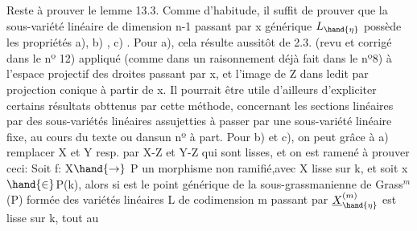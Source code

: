 
Reste à prouver le lemme 13.3.  Comme d'habitude, il suffit de prouver
que  la sous-variété linéaire de dimension n-1  passant par x générique
$L_{\hand{\eta}}$  possède les propriétés  a), b) , c) .  Pour  a),  cela résulte 
aussitôt de 2.3. (revu et corrigé dans le nº 12)  appliqué (comme dans un
raisonnement déjà fait dans le nº8) à l'espace projectif  des droites
passant par x, et l'image de Z dans ledit par projection conique à
partir de x. \hand{[}Il pourrait être utile d'ailleurs d'expliciter certains
 résultats obttenus par cette méthode, concernant les sections linéaires
par des sous-variétés linéaires assujetties à passer par une sous-variété
linéaire fixe,  au cours du texte ou dans\hand{/}un nº à part\hand{]}.  Pour  b) et c),
 on peut grâce à a)  remplacer X et Y  resp. par X-Z et Y-Z
qui sont lisses, et on est  ramené à prouver ceci:  Soit f: X$\hand{\rightarrow}$ P un
morphisme non ramifié,\hand{(}avec X lisse sur k, et soit  x $\hand{\in}$P(k), alors si
\hand{$\eta$} est le point générique  de  la sous-grassmanienne  de Grass$^{m}$(P)
formée des variétés linéaires L de codimension m passant par  
  $\underline{X}^{(m)}_{\hand{\eta}}$ est  lisse sur k, tout au
